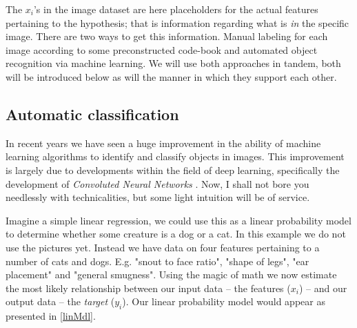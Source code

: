 \documentclass[a4paper]{article}
\begin{document}

The $x_i$'s in the image dataset are here placeholders for the actual features pertaining to the hypothesis; that is information regarding what is \emph{in} the specific image. There are two ways to get this information. Manual labeling for each image according to some preconstructed code-book and automated object recognition via machine learning. We will use both approaches in tandem, both will be introduced below as will the manner in which they support each other.\par


\subsection{Automatic classification}
In recent years we have seen a huge improvement in the ability of machine learning algorithms to identify and classify objects in images. This improvement is largely due to developments within the field of deep learning, specifically the development of \emph{Convoluted Neural Networks}  \citep[120-122]{francois2017deep}. Now, I shall not bore you needlessly with technicalities, but some light intuition will be of service.\par

Imagine a simple linear regression, we could use this as a linear probability model to determine whether some creature is a dog or a cat. In this example we do not use the pictures yet. Instead we have data on four features pertaining to a number of cats and dogs. E.g. "snout to face ratio", "shape of legs", "ear placement" and "general smugness". Using the magic of math we now estimate the most likely relationship between our input data -- the features ($x_i$) -- and our output data -- the \emph{target} ($y_i$). Our linear probability model would appear as presented in \autoref{linMdl}.\par
\end{document}
